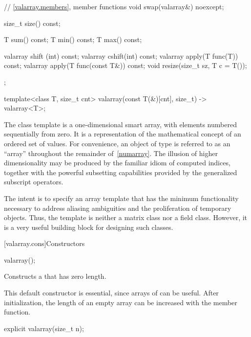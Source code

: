 \begin{codeblock}
{{    // \ref{valarray.members}, member functions
    void swap(valarray&) noexcept;

    size_t size() const;

    T sum() const;
    T min() const;
    T max() const;

    valarray shift (int) const;
    valarray cshift(int) const;
    valarray apply(T func(T)) const;
    valarray apply(T func(const T&)) const;
    void resize(size_t sz, T c = T());
  };

  template<class T, size_t cnt> valarray(const T(&)[cnt], size_t) -> valarray<T>;
}
\end{codeblock}

\pnum
The
class template
is a
one-dimensional smart array, with elements numbered sequentially from zero.
It is a representation of the mathematical concept
of an ordered set of values.
For convenience, an object of type  is referred
to as an ``array'' throughout the remainder of~\ref{numarray}.
The illusion of higher dimensionality
may be produced by the familiar idiom of computed indices, together
with the powerful subsetting capabilities provided
by the generalized subscript operators.
\begin{footnote}
The intent is to specify
an array template that has the minimum functionality
necessary to address aliasing ambiguities and the proliferation of
temporary objects.
Thus, the
template is neither a
matrix class nor a field class.
However, it is a very useful building block for designing such classes.
\end{footnote}

[valarray.cons]{Constructors}

%
\begin{itemdecl}
valarray();
\end{itemdecl}

\begin{itemdescr}
\pnum
\effects
Constructs a 
that has zero length.
\begin{footnote}
This default constructor is essential,
since arrays of
can be useful.
After initialization, the length of an empty array can be increased with the
member function.
\end{footnote}
\end{itemdescr}

%
\begin{itemdecl}
explicit valarray(size_t n);
\end{itemdecl}

